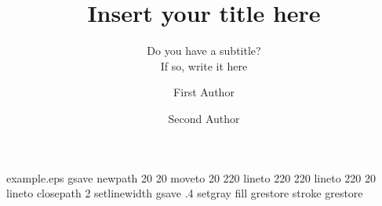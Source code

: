 %
%
%
%
%
\begin{filecontents*}{example.eps}
gsave
newpath
  20 20 moveto
  20 220 lineto
  220 220 lineto
  220 20 lineto
closepath
2 setlinewidth
gsave
  .4 setgray fill
grestore
stroke
grestore
\end{filecontents*}
%
\RequirePackage{fix-cm}
%
\documentclass[twocolumn]{svjour3}          %
%
\smartqed  %
%
\usepackage{graphicx}
%
%
%
%
%


\title{Insert your title here%
}
\subtitle{Do you have a subtitle?\\ If so, write it here}


\author{First Author         \and
        Second Author %
}



